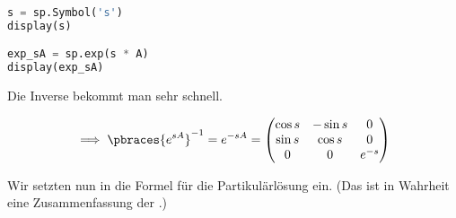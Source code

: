 \begin{solution}
\begin{lstlisting}[language = Python]
s = sp.Symbol('s')
display(s)

exp_sA = sp.exp(s * A)
display(exp_sA)

\end{lstlisting}

Die Inverse bekommt man sehr schnell.

\begin{align*}
    \implies
    \pbraces{e^{sA}}^{-1}
    =
    e^{-sA}
    =
    \begin{pmatrix}
        \cos{s} & -\sin{s} & 0 \\
        \sin{s} &  \cos{s} & 0 \\
        0       &  0       & e^{-s}
    \end{pmatrix}
\end{align*}

Wir setzten nun in die Formel für die Partikulärlösung ein.
(Das ist in Wahrheit eine Zusammenfassung der .)


\end{solution}
